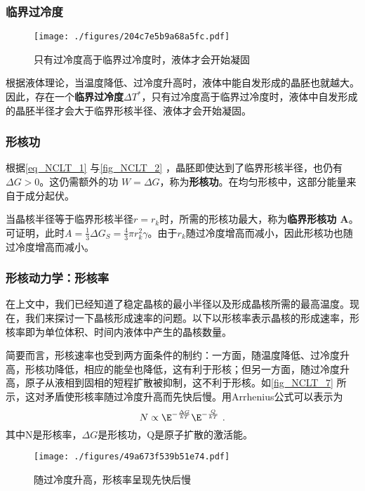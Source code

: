 \subsubsection{临界过冷度}

\begin{figure}[ht]
\centering
\texttt{[image: ./figures/204c7e5b9a68a5fc.pdf]}
\caption{只有过冷度高于临界过冷度时，液体才会开始凝固} \label{fig_NCLT_4}
\end{figure}
根据液体理论，当温度降低、过冷度升高时，液体中能自发形成的晶胚也就越大。因此，存在一个\textbf{临界过冷度$\Delta T^*$}，只有过冷度高于临界过冷度时，液体中自发形成的晶胚半径才会大于临界形核半径、液体才会开始凝固。

\subsubsection{形核功}
根据\autoref{eq_NCLT_1} 与\autoref{fig_NCLT_2} ，晶胚即使达到了临界形核半径，也仍有$\Delta G>0$。这仍需额外的功 $W=\Delta G$，称为\textbf{形核功}。在均匀形核中，这部分能量来自于成分起伏。

当晶核半径等于临界形核半径$r=r_k$时，所需的形核功最大，称为\textbf{临界形核功 A}。可证明，此时$A=\frac{1}{3}\Delta G_S=\frac{4}{3}\pi r_k^2 \gamma$。由于$r_k$随过冷度增高而减小，因此形核功也随过冷度增高而减小。%

\subsubsection{形核动力学：形核率}
在上文中，我们已经知道了稳定晶核的最小半径以及形成晶核所需的最高温度。现在，我们来探讨一下晶核形成速率的问题。以下以形核率表示晶核的形成速率，形核率即为单位体积、时间内液体中产生的晶核数量。%

简要而言，形核速率也受到两方面条件的制约：一方面，随温度降低、过冷度升高，形核功降低，相应的能垒也降低，这有利于形核；但另一方面，随过冷度升高，原子从液相到固相的短程扩散被抑制，这不利于形核。如\autoref{fig_NCLT_7} 所示，这对矛盾使形核率随过冷度升高而先快后慢。用Arrhenius公式可以表示为
$$N \propto \E^{-\frac{\Delta G}{kT}} \E^{-\frac{Q}{kT}}~.$$
其中N是形核率，$\Delta G$是形核功，Q是原子扩散的激活能。
\begin{figure}[ht]
\centering
\texttt{[image: ./figures/49a673f539b51e74.pdf]}
\caption{随过冷度升高，形核率呈现先快后慢} \label{fig_NCLT_7}
\end{figure}

